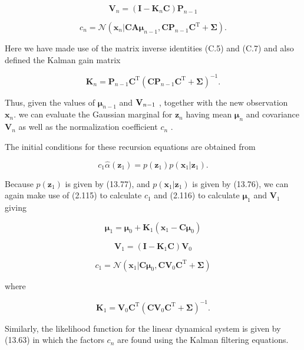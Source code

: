 \documentclass[
  10
]{article}
\begin{document}
\[
{\mathbf {V} _ {n}} = {(\mathbf {I} - \mathbf {K} _ {n} \mathbf {C}) \mathbf {P} _ {n - 1}}\tag{13.90}
\]

\[
{c _ {n}} = {\mathcal {N} (\mathbf {x} _ {n} | \mathbf {C A} \pmb {\mu} _ {n - 1}, \mathbf {C P} _ {n - 1} \mathbf {C} ^ {\mathrm{T}} + \pmb {\Sigma}).}\tag{13.91}
\]

Here we have made use of the matrix inverse identities (C.5) and (C.7)
and also defined the Kalman gain matrix

\[
\mathbf {K} _ {n} = \mathbf {P} _ {n - 1} \mathbf {C} ^ {\mathrm{T}} \left(\mathbf {C P} _ {n - 1} \mathbf {C} ^ {\mathrm{T}} + \boldsymbol {\Sigma}\right) ^ {- 1}.\tag{13.92}
\]

Thus, given the values of \(\pmb { \mu } _ { n - 1 }\) and
\({ \bf V } _ { n - 1 }\) , together with the new observation
\(\mathbf { x } _ { n } .\) we can evaluate the Gaussian marginal for
\(\mathbf { z } _ { n }\) having mean \(\pmb { \mu } _ { n }\) and
covariance \(\mathbf { V } _ { n }\) as well as the normalization
coefficient \(c _ { n }\) .

The initial conditions for these recursion equations are obtained from

\[
c _ {1} \widehat {\alpha} (\mathbf {z} _ {1}) = p (\mathbf {z} _ {1}) p (\mathbf {x} _ {1} | \mathbf {z} _ {1}).\tag{13.93}
\]

Because \(p ( \mathbf { z } _ { 1 } )\) is given by (13.77), and
\(p ( \mathbf { x } _ { 1 } | \mathbf { z } _ { 1 } )\) is given by
(13.76), we can again make use of (2.115) to calculate \(c _ { 1 }\) and
(2.116) to calculate \(\pmb { \mu } _ { 1 }\) and
\(\mathbf { V } _ { 1 }\) giving

\[
\boldsymbol {\mu} _ {1} = \boldsymbol {\mu} _ {0} + \mathbf {K} _ {1} (\mathbf {x} _ {1} - \mathbf {C} \boldsymbol {\mu} _ {0})\tag{13.94}
\]

\[
\mathbf {V} _ {1} = (\mathbf {I} - \mathbf {K} _ {1} \mathbf {C}) \mathbf {V} _ {0}\tag{13.95}
\]

\[
{c _ {1}} = {\mathcal {N} (\mathbf {x} _ {1} | \mathbf {C} \pmb {\mu} _ {0}, \mathbf {C V} _ {0} \mathbf {C} ^ {\mathrm{T}} + \pmb {\Sigma})}\tag{13.96}
\]

where

\[
\mathbf {K} _ {1} = \mathbf {V} _ {0} \mathbf {C} ^ {\mathrm{T}} \left(\mathbf {C V} _ {0} \mathbf {C} ^ {\mathrm{T}} + \boldsymbol {\Sigma}\right) ^ {- 1}.\tag{13.97}
\]

Similarly, the likelihood function for the linear dynamical system is
given by (13.63) in which the factors \(c _ { n }\) are found using the
Kalman filtering equations.
\end{document}
